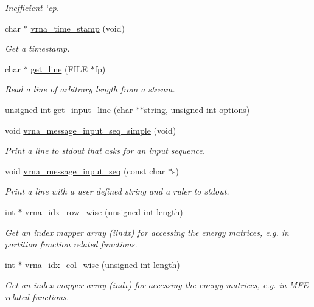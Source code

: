 \begin{DoxyCompactItemize}
\begin{DoxyCompactList}\small\item\em Inefficient `cp\textquotesingle{}. \end{DoxyCompactList}\item 
char $\ast$ \hyperlink{group__utils_gad3bbe8d01afb1310609cb018d5290550}{vrna\+\_\+time\+\_\+stamp} (void)
\begin{DoxyCompactList}\small\item\em Get a timestamp. \end{DoxyCompactList}\item 
char $\ast$ \hyperlink{group__utils_gabe51806d14cff0789a8c1df7dbc45b71}{get\+\_\+line} (F\+I\+L\+E $\ast$fp)
\begin{DoxyCompactList}\small\item\em Read a line of arbitrary length from a stream. \end{DoxyCompactList}\item 
unsigned int \hyperlink{group__utils_ga8ef1835eb83f542396f59f0b205965e5}{get\+\_\+input\+\_\+line} (char $\ast$$\ast$string, unsigned int options)
\item 
void \hyperlink{group__utils_gaee1dd652ca5b9e56b096963a1576f73b}{vrna\+\_\+message\+\_\+input\+\_\+seq\+\_\+simple} (void)
\begin{DoxyCompactList}\small\item\em Print a line to {\itshape stdout} that asks for an input sequence. \end{DoxyCompactList}\item 
void \hyperlink{group__utils_gaf4d194d558b0c975f269de01dea52460}{vrna\+\_\+message\+\_\+input\+\_\+seq} (const char $\ast$s)
\begin{DoxyCompactList}\small\item\em Print a line with a user defined string and a ruler to stdout. \end{DoxyCompactList}\item 
int $\ast$ \hyperlink{group__utils_ga70b180e9ea764218a82647a1cd347445}{vrna\+\_\+idx\+\_\+row\+\_\+wise} (unsigned int length)
\begin{DoxyCompactList}\small\item\em Get an index mapper array (iindx) for accessing the energy matrices, e.\+g. in partition function related functions. \end{DoxyCompactList}\item 
int $\ast$ \hyperlink{group__utils_ga89ebc69c52fa0c78c9e1974b0017746b}{vrna\+\_\+idx\+\_\+col\+\_\+wise} (unsigned int length)
\begin{DoxyCompactList}\small\item\em Get an index mapper array (indx) for accessing the energy matrices, e.\+g. in M\+F\+E related functions. \end{DoxyCompactList}\end{DoxyCompactItemize}
